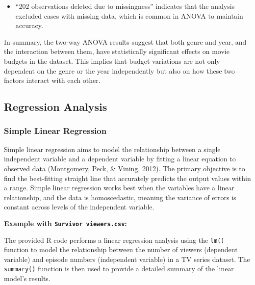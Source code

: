 \documentclass[
]{book}
\providecommand{\tightlist}{%
  \setlength{\itemsep}{0pt}\setlength{\parskip}{0pt}}
\begin{document}
\begin{enumerate}
  \begin{itemize}
  \tightlist
  \item
    ``202 observations deleted due to missingness'' indicates that the analysis excluded cases with missing data, which is common in ANOVA to maintain accuracy.
  \end{itemize}
\end{enumerate}

In summary, the two-way ANOVA results suggest that both genre and year, and the interaction between them, have statistically significant effects on movie budgets in the dataset. This implies that budget variations are not only dependent on the genre or the year independently but also on how these two factors interact with each other.

\hypertarget{regression-analysis}{%
\subsection*{Regression Analysis}\label{regression-analysis}}

\hypertarget{simple-linear-regression}{%
\subsubsection*{Simple Linear Regression}\label{simple-linear-regression}}

Simple linear regression aims to model the relationship between a single independent variable and a dependent variable by fitting a linear equation to observed data (Montgomery, Peck, \& Vining, 2012). The primary objective is to find the best-fitting straight line that accurately predicts the output values within a range. Simple linear regression works best when the variables have a linear relationship, and the data is homoscedastic, meaning the variance of errors is constant across levels of the independent variable.

\textbf{Example with \texttt{Survivor\ viewers.csv}:}

The provided R code performs a linear regression analysis using the \texttt{lm()} function to model the relationship between the number of viewers (dependent variable) and episode numbers (independent variable) in a TV series dataset. The \texttt{summary()} function is then used to provide a detailed summary of the linear model's results.
\end{document}

